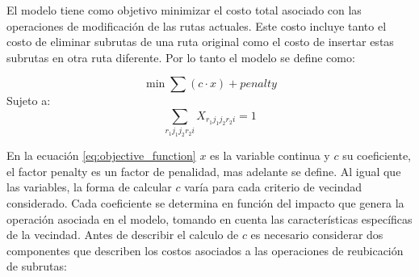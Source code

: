 \documentclass{article}
\begin{document}
El modelo tiene como objetivo minimizar el costo total asociado con las operaciones de modificación de las rutas actuales. Este costo incluye tanto el costo de eliminar subrutas de una ruta original como el costo de insertar estas subrutas en otra ruta diferente. Por lo tanto el modelo se define como:

\begin{equation}
\min \sum (c \cdot x) +penalty
\label{eq:objective_function}
\end{equation}
Sujeto a:
\begin{equation}
\sum \limits_{r_1j_1j_2r_2i} X_{{r_1}{j_1}{j_2}{r_2}{i}} = 1 
\label{eq:constraint}
\end{equation}

En la ecuación \ref{eq:objective_function} $x$ es la variable continua y $c$ su coeficiente, el factor penalty es un factor de penalidad, mas adelante se define. Al igual que las variables, la forma de calcular $c$ varía para cada criterio de vecindad considerado. Cada coeficiente se determina en función del impacto que genera la operación asociada en el modelo, tomando en cuenta las características específicas de la vecindad. Antes de describir el calculo de $c$ es necesario considerar dos componentes que describen los costos asociados a las operaciones de reubicación de subrutas:
\end{document}

